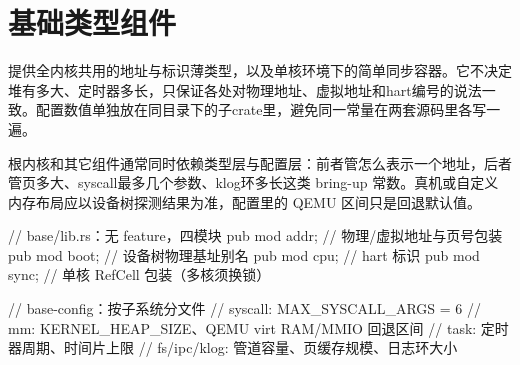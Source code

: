 
\section{基础类型组件}

提供全内核共用的地址与标识薄类型，以及单核环境下的简单同步容器。它不决定堆有多大、定时器多长，只保证各处对物理地址、虚拟地址和hart编号的说法一致。配置数值单独放在同目录下的子crate里，避免同一常量在两套源码里各写一遍。

根内核和其它组件通常同时依赖类型层与配置层：前者管怎么表示一个地址，后者管页多大、syscall最多几个参数、klog环多长这类 bring-up 常数。真机或自定义内存布局应以设备树探测结果为准，配置里的 QEMU 区间只是回退默认值。

\begin{rustcode}
// base/lib.rs：无 feature，四模块
pub mod addr;  // 物理/虚拟地址与页号包装
pub mod boot;  // 设备树物理基址别名
pub mod cpu;   // hart 标识
pub mod sync;  // 单核 RefCell 包装（多核须换锁）

// base-config：按子系统分文件
// syscall: MAX_SYSCALL_ARGS = 6
// mm: KERNEL_HEAP_SIZE、QEMU virt RAM/MMIO 回退区间
// task: 定时器周期、时间片上限
// fs/ipc/klog: 管道容量、页缓存规模、日志环大小
\end{rustcode}
